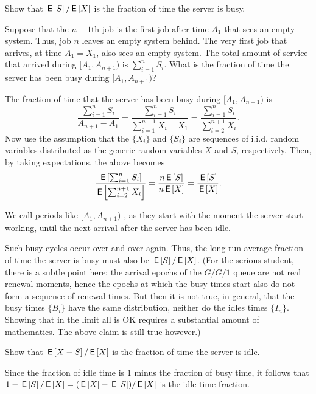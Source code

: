 \begin{exercise}{\faCalculator}\label{ex:29}
  Show that $\,\mathsf{E}\left[S\right]/\,\mathsf{E}\left[X\right]$ is the fraction of time the server is busy.
  \begin{hint}
Suppose that the $n+1$th job is the first job after time $A_1$ that sees an empty system.  Thus, job $n$ leaves an empty system behind. The very first job that arrives,  at time $A_1=X_1$, also sees an empty system. The total amount of service that arrived during $[A_1, A_{n+1})$ is $\sum_{i=1}^n S_i$.
    What is the fraction of time the server has been busy during $[A_1, A_{n+1})$? 
  \end{hint}
  \begin{solution}
 The
    fraction of time that the server has been busy during $[A_1, A_{n+1})$
    is
        \begin{equation*}
\frac{\sum_{i=1}^n S_i}{A_{n+1}-A_1} 
=          \frac{\sum_{i=1}^n S_i}{\sum_{i=1}^{n+1}X_i -X_1} 
=          \frac{\sum_{i=1}^n S_i}{\sum_{i=2}^{n+1}X_i}.
        \end{equation*}
        Now use the assumption that the $\{X_i\}$ and $\{S_i\}$ are
        sequences of i.i.d. random variables distributed as the
        generic random variables $X$ and $S$, respectively. Then, by
        taking expectations, the above becomes
        \begin{equation*}
\frac{\,\mathsf{E}\left[\sum_{i=1}^n S_i\right]}{\,\mathsf{E}\left[\sum_{i=2}^{n+1}X_i\right]} 
= \frac{n \,\mathsf{E}\left[S\right] }{n \,\mathsf{E}\left[X\right]} =
 \frac{ \,\mathsf{E}\left[S\right] }{ \,\mathsf{E}\left[X\right]}.
        \end{equation*}

We call periods like $[A_1, A_{n+1})$ , as they start with the moment the server start working, until the next arrival after the server has been idle. 

Such busy cycles occur over and over again.
Thus, the long-run average fraction of time the server is busy must also be $\,\mathsf{E}\left[S\right]/\,\mathsf{E}\left[X\right]$.
(For the serious student, there is a subtle point here: the arrival epochs of the $G/G/1$ queue are not real renewal moments, hence the epochs at which the busy times start also do not form a sequence of renewal times.
But then it is not true, in general, that the busy times $\{B_i\}$ have the same distribution, neither do the idles times $\{I_n\}$.
Showing that in the limit all is OK requires a substantial amount of mathematics.
The above claim is still true however.)
  \end{solution}
\end{exercise}

\begin{exercise}{\faFlask}
 Show that $\,\mathsf{E}\left[X - S\right]/\,\mathsf{E}\left[X\right]$ is the fraction of time
  the server is idle.
  \begin{solution}
    Since the fraction of idle time is $1$ minus the fraction of busy
    time, it follows that $1-\,\mathsf{E}\left[S\right]/ \,\mathsf{E}\left[X\right] = (\,\mathsf{E}\left[X\right] - \,\mathsf{E}\left[S\right])/\,\mathsf{E}\left[X\right]$ is the
    idle time fraction.
  \end{solution}
\end{exercise}

